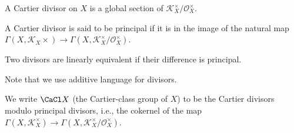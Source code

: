 A Cartier divisor on $X$ is a global section of $\mathcal{K}_X^\times/\mathcal{O}_X^\times$.

A Cartier divisor is said to be principal if it is in the image of the natural map
$\Gamma(X, \mathcal{K}_X \times)\to \Gamma(X, \mathcal{K}_X^\times/\mathcal{O}_X^\times)$.

Two divisors are linearly equivalent if their difference is principal.

Note that we use additive language for divisors.

We write $\CaCl X$ (the Cartier-class group of $X$) to be the Cartier divisors
modulo principal divisors, i.e., the cokernel of the map
$\Gamma(X, \mathcal{K}_X^\times)\to \Gamma(X, \mathcal{K}_X^\times/\mathcal{O}_X^\times)$.
